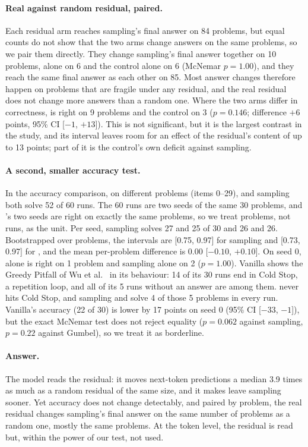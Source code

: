 \paragraph{Real against random residual, paired.}
Each residual arm reaches sampling's final answer on 84 problems, %
but equal counts do not show that the two arms change answers on the same problems, so we pair them directly.
They change sampling's final answer together on 10 problems, \ST{} alone on 6 and the control alone on 6 %
(McNemar $p = 1.00$), and they reach the same final answer as each other on 85. %
Most answer changes therefore happen on problems that are fragile under any residual, and the real residual does
not change more answers than a random one.
Where the two arms differ in correctness, \ST{} is right on 9 problems and the control on 3 %
($p = 0.146$; difference $+6$ points, 95\% CI [$-1$, $+13$]). %
This is not significant, but it is the largest contrast in the study, and its interval leaves room for an effect
of the residual's content of up to 13 points; part of it is the control's own deficit against sampling. %

\paragraph{A second, smaller accuracy test.}
In the accuracy comparison, on different problems (items 0--29), \GST{} and sampling both solve 52 of 60 runs. %
The 60 runs are two seeds of the same 30 problems, and \GST{}'s two seeds are right on exactly the same problems, %
so we treat problems, not runs, as the unit.
Per seed, sampling solves 27 and 25 of 30 and \GST{} 26 and 26. %
Bootstrapped over problems, the intervals are [0.75, 0.97] for sampling and [0.73, 0.97] for \GST{}, %
and the mean per-problem difference is 0.00 [$-0.10$, $+0.10$]. %
On seed 0, \GST{} alone is right on 1 problem and sampling alone on 2 ($p = 1.00$). %
Vanilla \ST{} shows the Greedy Pitfall of Wu et al.~\cite{wu2025single} in its behaviour:
14 of its 30 runs end in Cold Stop, a repetition loop, %
and all of its 5 runs without an answer are among them. %
\GST{} never hits Cold Stop, %
and sampling and \GST{} solve 4 of those 5 problems in every run. %
Vanilla's accuracy (22 of 30) is lower by 17 points on seed 0 (95\% CI [$-33$, $-1$]), but the exact McNemar test %
does not reject equality ($p = 0.062$ against sampling, $p = 0.22$ against Gumbel), so we treat it as borderline. %

\paragraph{Answer.}
The model reads the residual: it moves next-token predictions a median 3.9 times as much as a random residual of the %
same size, and it makes \ST{} leave sampling sooner.
Yet accuracy does not change detectably, and paired by problem, the real residual changes sampling's final answer
on the same number of problems as a random one, mostly the same problems.
At the token level, the residual is read but, within the power of our test, not used.
